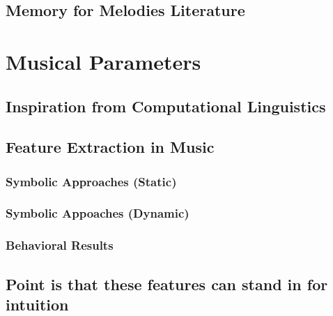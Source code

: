 \documentclass[]{book}
\theoremstyle{definition}
\theoremstyle{definition}
\theoremstyle{definition}
\theoremstyle{remark}
\begin{document}
\hypertarget{memory-for-melodies-literature}{%
\section{Memory for Melodies
Literature}\label{memory-for-melodies-literature}}

\hypertarget{musical-parameters}{%
\chapter{Musical Parameters}\label{musical-parameters}}

\hypertarget{inspiration-from-computational-linguistics}{%
\section{Inspiration from Computational
Linguistics}\label{inspiration-from-computational-linguistics}}

\hypertarget{feature-extraction-in-music}{%
\section{Feature Extraction in
Music}\label{feature-extraction-in-music}}

\hypertarget{symbolic-approaches-static}{%
\subsection{Symbolic Approaches
(Static)}\label{symbolic-approaches-static}}

\hypertarget{symbolic-appoaches-dynamic}{%
\subsection{Symbolic Appoaches
(Dynamic)}\label{symbolic-appoaches-dynamic}}

\hypertarget{behavioral-results}{%
\subsection{Behavioral Results}\label{behavioral-results}}

\hypertarget{point-is-that-these-features-can-stand-in-for-intuition}{%
\section{Point is that these features can stand in for
intuition}\label{point-is-that-these-features-can-stand-in-for-intuition}}
\end{document}
